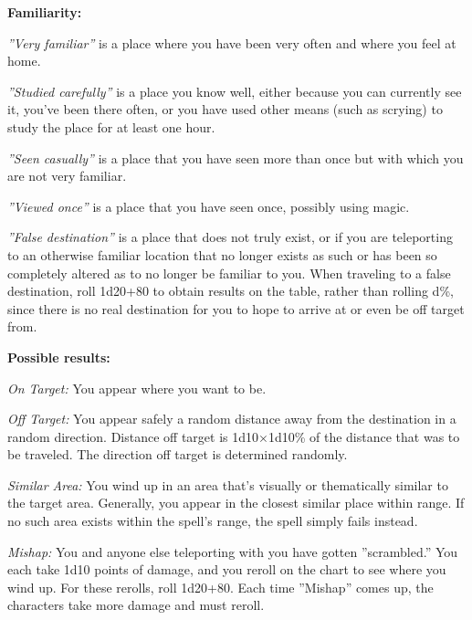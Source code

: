 \textbf{Familiarity:}
\begin{list}{}{\leftmargin=1em}
 \item \emph{''Very familiar''} is a place where you have been very often and where you feel at home. 
 \item \emph{''Studied carefully''} is a place you know well, either because you can currently see it, you've been there often, 
or you have used other means (such as scrying) to study the place for at least one hour. 
 \item \emph{''Seen casually''} is a place that you have seen more than once but with which you are not very familiar. 
 \item \emph{''Viewed once''} is a place that you have seen once, possibly using magic.
 \item \emph{''False destination''} is a place that does not truly exist, or if you are teleporting to an otherwise familiar location 
that no longer exists as such or has been so completely altered as to no longer be familiar to you. 
When traveling to a false destination, roll 1d20+80 to obtain results on the table, rather than rolling d\%,
since there is no real destination for you to hope to arrive at or even be off target from.
\end{list}

\textbf{Possible results:}
\begin{list}{}{\leftmargin=1em}
\item \emph{On Target:} You appear where you want to be.
\item \emph{Off Target:}
You appear safely a random distance away from the destination in a random direction. 
Distance off target is 1d10$\times$1d10\% of the distance that was to be traveled. 
The direction off target is determined randomly.
\item \emph{Similar Area:}
You wind up in an area that's visually or thematically similar to the target area.
Generally, you appear in the closest similar place within range. If no such area exists within the spell's range, the spell simply fails instead.
\item \emph{Mishap:}
You and anyone else teleporting with you have gotten ''scrambled.'' 
You each take 1d10 points of damage, and you reroll on the chart to see where you wind up. 
For these rerolls, roll 1d20+80. Each time ''Mishap'' comes up, the characters take more damage and must reroll.
\end{list}
